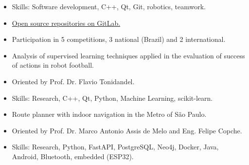 \documentclass[11pt,a4paper,ragged2e,withhyper]{altacv}
\begin{document}
\begin{paracol}{2}

\begin{itemize}
\item Skills: Software development, C++, Qt, Git, robotics, teamwork.
\item \href{https://gitlab.com/robofei/ssl}{Open source repositories on GitLab.}
\item Participation in 5 competitions, 3 national (Brazil) and 2 international.
\end{itemize}


\begin{itemize}
\item Analysis of supervised learning techniques applied in the evaluation of success of actions in robot football.
\item Oriented by Prof. Dr. Flavio Tonidandel.
\item Skills: Research, C++, Qt, Python, Machine Learning, scikit-learn.
\end{itemize}

\divider

\begin{itemize}
  \item Route planner with indoor navigation in the Metro of São Paulo.
  \item Oriented by Prof. Dr. Marco Antonio Assis de Melo and Eng. Felipe Copche.
  \item Skills: Research, Python, FastAPI, PostgreSQL, Neo4j, Docker, Java, Android, Bluetooth, embedded (ESP32).
\end{itemize}
  
\medskip




\end{paracol}
\end{document}
